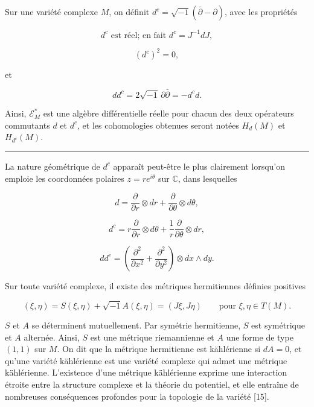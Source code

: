 \documentclass[
  french,
  a3paper,
  a3paper]{extarticle}
\begin{document}
Sur une variété complexe \(M\), on définit
\(d^c=\sqrt{-1}(\bar\partial-\partial)\), avec les propriétés

\[d^c\text{ est réel; en fait }d^c=J^{-1}dJ,\]

\[(d^c)^2=0,\]

et

\[dd^c=2\sqrt{-1}\,\partial\bar\partial=-d^cd.\]

Ainsi, \(\mathcal E_M^*\) est une algèbre différentielle réelle pour
chacun des deux opérateurs commutants \(d\) et \(d^c\), et les
cohomologies obtenues seront notées \(H_d(M)\) et \(H_{d^c}(M)\).

\clearpage



\par

\vspace{0.7mm}\hrule\vspace{1.6mm}

\fontsize{9}{11}\selectfont

La nature géométrique de \(d^c\) apparaît peut-être le plus clairement
lorsqu'on emploie les coordonnées polaires \(z=re^{i\theta}\) sur
\(\mathbb C\), dans lesquelles

\[d=\frac{\partial}{\partial r}\otimes dr+\frac{\partial}{\partial\theta}\otimes d\theta,\]

\[d^c=r\frac{\partial}{\partial r}\otimes d\theta+\frac{1}{r}\frac{\partial}{\partial\theta}\otimes dr,\]

\[dd^c=\left(\frac{\partial^2}{\partial x^2}+\frac{\partial^2}{\partial y^2}\right)\otimes dx\wedge dy.\]

Sur toute variété complexe, il existe des métriques hermitiennes
définies positives

\[(\xi,\eta)=S(\xi,\eta)+\sqrt{-1}A(\xi,\eta)=(J\xi,J\eta)\qquad\text{pour }\xi,\eta\in T(M).\]

\(S\) et \(A\) se déterminent mutuellement. Par symétrie hermitienne,
\(S\) est symétrique et \(A\) alternée. Ainsi, \(S\) est une métrique
riemannienne et \(A\) une forme de type \((1,1)\) sur \(M\). On dit que
la métrique hermitienne est kählérienne si \(dA=0\), et qu'une variété
kählérienne est une variété complexe qui admet une métrique kählérienne.
L'existence d'une métrique kählérienne exprime une interaction étroite
entre la structure complexe et la théorie du potentiel, et elle entraîne
de nombreuses conséquences profondes pour la topologie de la variété
{[}15{]}.
\end{document}
